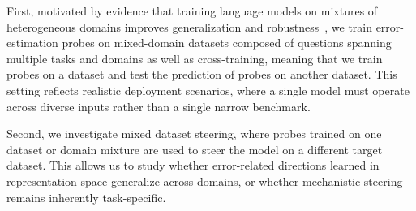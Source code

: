 \documentclass[sigconf]{acmart}
\begin{document}
First, motivated by evidence that training language models on mixtures of heterogeneous domains improves generalization and robustness~\citep{raffel2020exploring, fedus2021switch, arora2022expert}, we train error-estimation probes on mixed-domain datasets composed of questions spanning multiple tasks and domains as well as cross-training, meaning that we train probes on a dataset and test the prediction of probes on another dataset. This setting reflects realistic deployment scenarios, where a single model must operate across diverse inputs rather than a single narrow benchmark.

Second, we investigate mixed dataset steering, where probes trained on one dataset or domain mixture are used to steer the model on a different target dataset. This allows us to study whether error-related directions learned in representation space generalize across domains, or whether mechanistic steering remains inherently task-specific. 

 


\end{document}
